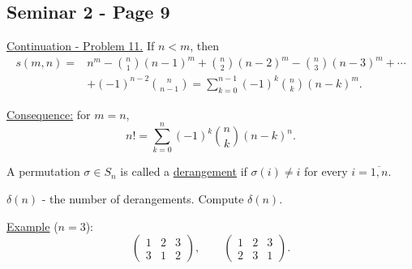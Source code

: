 
\subsection*{Seminar 2 - Page 9}

\noindent\underline{Continuation - Problem 11.} If $n<m$, then
\[
\begin{aligned}
 s(m,n)={}&n^m-\binom{n}{1}(n-1)^m
          +\binom{n}{2}(n-2)^m-\binom{n}{3}(n-3)^m+\cdots\\
         &+(-1)^{n-2}\binom{n}{n-1}
          =\boxed{\displaystyle\sum_{k=0}^{n-1}(-1)^k\binom{n}{k}(n-k)^m}.
\end{aligned}
\]

\noindent\underline{Consequence:} for $m=n$,
\[
 \boxed{\displaystyle n!=\sum_{k=0}^{n}(-1)^k\binom{n}{k}(n-k)^n}.
\]

\bigskip
\noindent{}\quad A permutation $\sigma\in S_n$ is called a
 \underline{derangement} if $\sigma(i)\neq i$ for every
 $i=\overline{1,n}$.

\noindent $\delta(n)$ - the number of derangements. Compute $\delta(n)$.

\noindent\underline{Example} ($n=3$):
\[
 \begin{pmatrix}1&2&3\\3&1&2\end{pmatrix},\qquad
 \begin{pmatrix}1&2&3\\2&3&1\end{pmatrix}.
\]

